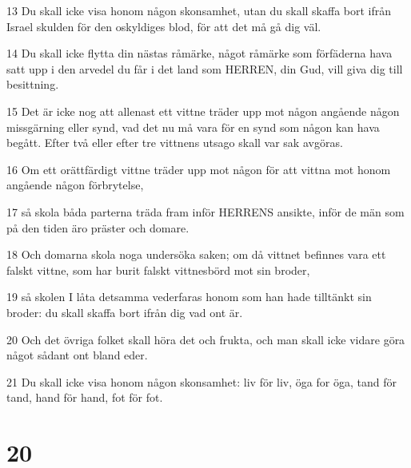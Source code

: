 \par 13 Du skall icke visa honom någon skonsamhet, utan du skall skaffa bort ifrån Israel skulden för den oskyldiges blod, för att det må gå dig väl.
\par 14 Du skall icke flytta din nästas råmärke, något råmärke som förfäderna hava satt upp i den arvedel du får i det land som HERREN, din Gud, vill giva dig till besittning.
\par 15 Det är icke nog att allenast ett vittne träder upp mot någon angående någon missgärning eller synd, vad det nu må vara för en synd som någon kan hava begått. Efter två eller efter tre vittnens utsago skall var sak avgöras.
\par 16 Om ett orättfärdigt vittne träder upp mot någon för att vittna mot honom angående någon förbrytelse,
\par 17 så skola båda parterna träda fram inför HERRENS ansikte, inför de män som på den tiden äro präster och domare.
\par 18 Och domarna skola noga undersöka saken; om då vittnet befinnes vara ett falskt vittne, som har burit falskt vittnesbörd mot sin broder,
\par 19 så skolen I låta detsamma vederfaras honom som han hade tilltänkt sin broder: du skall skaffa bort ifrån dig vad ont är.
\par 20 Och det övriga folket skall höra det och frukta, och man skall icke vidare göra något sådant ont bland eder.
\par 21 Du skall icke visa honom någon skonsamhet: liv för liv, öga for öga, tand för tand, hand för hand, fot för fot.

\chapter{20}

